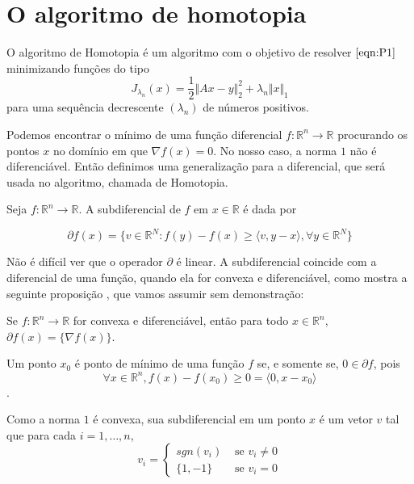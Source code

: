 \chapter{O algoritmo de homotopia}

O algoritmo de Homotopia \cite{dontsa} é um algoritmo com o objetivo de resolver $\eqref{eqn:P1}$ minimizando funções do tipo
$$J_{\lambda_n}(x) = \frac{1}{2} \Vert Ax - y \Vert_2^2 + \lambda_n \Vert x \Vert_1$$
para uma sequência decrescente $(\lambda_n)$ de números positivos.

Podemos encontrar o mínimo de uma função diferencial $f: \mathbb{R}^n \longrightarrow \mathbb{R}$ procurando os pontos $x$ no domínio em que $\nabla f(x) = 0$. No nosso caso, a norma $1$ não é diferenciável. Então definimos uma generalização para a diferencial, que será usada no algoritmo, chamada de Homotopia.

\begin{definicao}
Seja $f: \mathbb{R}^n \longrightarrow \mathbb{R}$. A subdiferencial de $f$ em $x \in \mathbb{R}$ é dada por

$$\partial f(x) = \{ v \in \mathbb{R}^N : f(y) - f(x) \geq \langle v, y - x \rangle, \forall y \in \mathbb{R}^N \}$$

\end{definicao}

Não é difícil ver que o operador $\partial$ é linear. A subdiferencial coincide com a diferencial de uma função, quando ela for convexa e diferenciável, como mostra a seguinte proposição \cite{bach2012optimization}, que vamos assumir sem demonstração:

\begin{proposicao}
Se $f: \mathbb{R}^n \longrightarrow \mathbb{R}$ for convexa e diferenciável, então para todo $x \in \mathbb{R}^n$, $\partial f(x) = \{ \nabla f(x) \}$.
\end{proposicao}

Um ponto $x_0$ é ponto de mínimo de uma função $f$ se, e somente se, $0 \in \partial f$, pois
$$ \forall x \in \mathbb{R}^n, f(x) - f(x_0) \geq 0 = \langle 0, x - x_0 \rangle$$.

Como a norma $1$ é convexa, sua subdiferencial em um ponto $x$ é um vetor $v$ tal que para cada $i = 1, \hdots, n$,
$$ v_i =
\begin{cases}
	sgn(v_i) & \mbox{ se } v_i \neq 0 \\
	\lbrace 1, -1\rbrace & \mbox{ se } v_i = 0
\end{cases}$$

